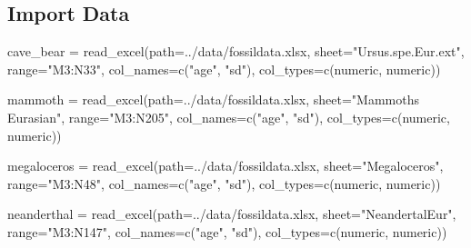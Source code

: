 \documentclass[
]{article}
\newenvironment{Shaded}{\begin{snugshade}}{\end{snugshade}}
\newcommand{\AttributeTok}[1]{\textcolor[rgb]{0.77,0.63,0.00}{#1}}
\newcommand{\FunctionTok}[1]{\textcolor[rgb]{0.00,0.00,0.00}{#1}}
\newcommand{\NormalTok}[1]{#1}
\newcommand{\OtherTok}[1]{\textcolor[rgb]{0.56,0.35,0.01}{#1}}
\newcommand{\StringTok}[1]{\textcolor[rgb]{0.31,0.60,0.02}{#1}}
\begin{document}
\hypertarget{import-data}{%
\subsection{Import Data}\label{import-data}}

\begin{Shaded}
\begin{Highlighting}[]
\NormalTok{cave\_bear }\OtherTok{=} \FunctionTok{read\_excel}\NormalTok{(}\AttributeTok{path=}\StringTok{\textquotesingle{}../data/fossildata.xlsx\textquotesingle{}}\NormalTok{,}
                     \AttributeTok{sheet=}\StringTok{"Ursus.spe.Eur.ext"}\NormalTok{, }
                     \AttributeTok{range=}\StringTok{"M3:N33"}\NormalTok{, }
                     \AttributeTok{col\_names=}\FunctionTok{c}\NormalTok{(}\StringTok{"age"}\NormalTok{, }\StringTok{"sd"}\NormalTok{), }
                     \AttributeTok{col\_types=}\FunctionTok{c}\NormalTok{(}\StringTok{\textquotesingle{}numeric\textquotesingle{}}\NormalTok{, }\StringTok{\textquotesingle{}numeric\textquotesingle{}}\NormalTok{))}

\NormalTok{mammoth }\OtherTok{=} \FunctionTok{read\_excel}\NormalTok{(}\AttributeTok{path=}\StringTok{\textquotesingle{}../data/fossildata.xlsx\textquotesingle{}}\NormalTok{,}
                     \AttributeTok{sheet=}\StringTok{"Mammoths Eurasian"}\NormalTok{, }
                     \AttributeTok{range=}\StringTok{"M3:N205"}\NormalTok{, }
                     \AttributeTok{col\_names=}\FunctionTok{c}\NormalTok{(}\StringTok{"age"}\NormalTok{, }\StringTok{"sd"}\NormalTok{), }
                     \AttributeTok{col\_types=}\FunctionTok{c}\NormalTok{(}\StringTok{\textquotesingle{}numeric\textquotesingle{}}\NormalTok{, }\StringTok{\textquotesingle{}numeric\textquotesingle{}}\NormalTok{))}

\NormalTok{megaloceros }\OtherTok{=} \FunctionTok{read\_excel}\NormalTok{(}\AttributeTok{path=}\StringTok{\textquotesingle{}../data/fossildata.xlsx\textquotesingle{}}\NormalTok{,}
                     \AttributeTok{sheet=}\StringTok{"Megaloceros"}\NormalTok{, }
                     \AttributeTok{range=}\StringTok{"M3:N48"}\NormalTok{, }
                     \AttributeTok{col\_names=}\FunctionTok{c}\NormalTok{(}\StringTok{"age"}\NormalTok{, }\StringTok{"sd"}\NormalTok{), }
                     \AttributeTok{col\_types=}\FunctionTok{c}\NormalTok{(}\StringTok{\textquotesingle{}numeric\textquotesingle{}}\NormalTok{, }\StringTok{\textquotesingle{}numeric\textquotesingle{}}\NormalTok{))}

\NormalTok{neanderthal }\OtherTok{=} \FunctionTok{read\_excel}\NormalTok{(}\AttributeTok{path=}\StringTok{\textquotesingle{}../data/fossildata.xlsx\textquotesingle{}}\NormalTok{,}
                     \AttributeTok{sheet=}\StringTok{"NeandertalEur"}\NormalTok{, }
                     \AttributeTok{range=}\StringTok{"M3:N147"}\NormalTok{, }
                     \AttributeTok{col\_names=}\FunctionTok{c}\NormalTok{(}\StringTok{"age"}\NormalTok{, }\StringTok{"sd"}\NormalTok{), }
                     \AttributeTok{col\_types=}\FunctionTok{c}\NormalTok{(}\StringTok{\textquotesingle{}numeric\textquotesingle{}}\NormalTok{, }\StringTok{\textquotesingle{}numeric\textquotesingle{}}\NormalTok{))}


\end{Highlighting}
\end{Shaded}
\end{document}
